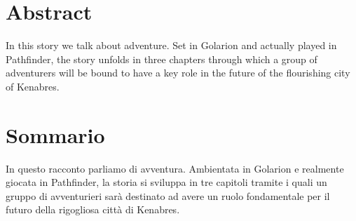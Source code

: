 
\begingroup
\let\clearpage\relax
\let\cleardoublepage\relax
\let\cleardoublepage\relax

\chapter*{Abstract}
In this story we talk about adventure. Set in Golarion and actually played in Pathfinder, the story unfolds in three chapters through which a group of adventurers will be bound to have a key role in the future of the flourishing city of Kenabres.

\vfill

\chapter*{Sommario}
In questo racconto parliamo di avventura. Ambientata in Golarion e realmente giocata in Pathfinder, la storia si sviluppa in tre capitoli tramite i quali un gruppo di avventurieri sar\`a destinato ad avere un ruolo fondamentale per il futuro della rigogliosa citt\`a di Kenabres.


\endgroup			

\vfill

